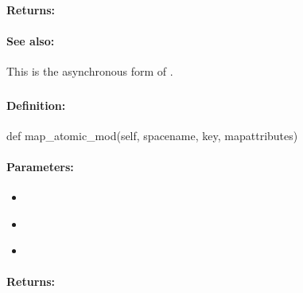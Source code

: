 \paragraph{Returns:}


\paragraph{See also:}  This is the asynchronous form of .

\pagebreak
\subsubsection{}
\label{api:python:map_atomic_mod}


\paragraph{Definition:}
\begin{pythoncode}
def map_atomic_mod(self, spacename, key, mapattributes)
\end{pythoncode}

\paragraph{Parameters:}
\begin{itemize}[noitemsep]
\item {}\\

\item {}\\

\item {}\\

\end{itemize}

\paragraph{Returns:}


\pagebreak
\subsubsection{}
\label{api:python:async_map_atomic_mod}


